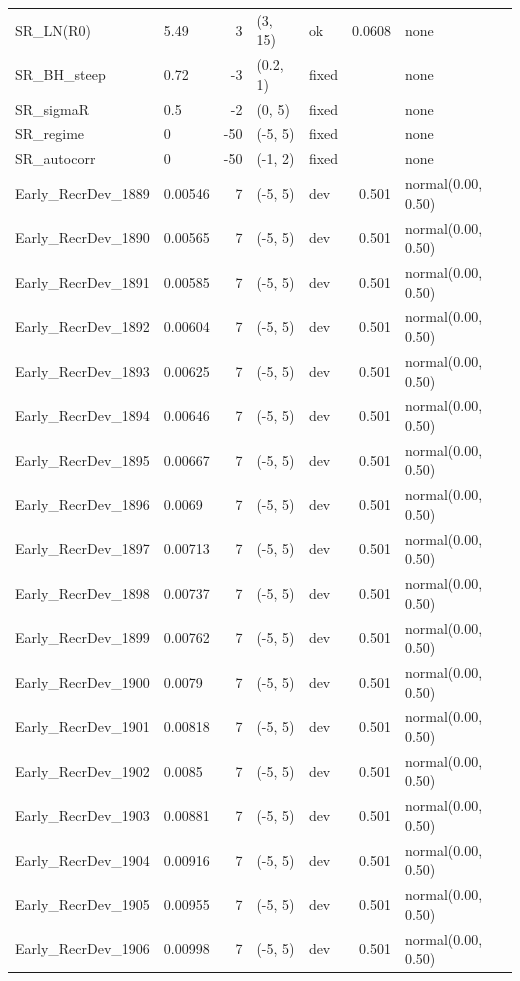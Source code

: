 \documentclass[
  english,
]{article}
\begin{document}
\begin{landscape}
\begin{longtable}{llrllrl}
SR\_LN(R0) & 5.49 & 3 & (3, 15) & ok & 0.0608 & none \\ 
SR\_BH\_steep & 0.72 & -3 & (0.2, 1) & fixed &  & none \\ 
SR\_sigmaR & 0.5 & -2 & (0, 5) & fixed &  & none \\ 
SR\_regime & 0 & -50 & (-5, 5) & fixed &  & none \\ 
SR\_autocorr & 0 & -50 & (-1, 2) & fixed &  & none \\ 
Early\_RecrDev\_1889 & 0.00546 & 7 & (-5, 5) & dev & 0.501 & normal(0.00, 0.50) \\ 
Early\_RecrDev\_1890 & 0.00565 & 7 & (-5, 5) & dev & 0.501 & normal(0.00, 0.50) \\ 
Early\_RecrDev\_1891 & 0.00585 & 7 & (-5, 5) & dev & 0.501 & normal(0.00, 0.50) \\ 
Early\_RecrDev\_1892 & 0.00604 & 7 & (-5, 5) & dev & 0.501 & normal(0.00, 0.50) \\ 
Early\_RecrDev\_1893 & 0.00625 & 7 & (-5, 5) & dev & 0.501 & normal(0.00, 0.50) \\ 
Early\_RecrDev\_1894 & 0.00646 & 7 & (-5, 5) & dev & 0.501 & normal(0.00, 0.50) \\ 
Early\_RecrDev\_1895 & 0.00667 & 7 & (-5, 5) & dev & 0.501 & normal(0.00, 0.50) \\ 
Early\_RecrDev\_1896 & 0.0069 & 7 & (-5, 5) & dev & 0.501 & normal(0.00, 0.50) \\ 
Early\_RecrDev\_1897 & 0.00713 & 7 & (-5, 5) & dev & 0.501 & normal(0.00, 0.50) \\ 
Early\_RecrDev\_1898 & 0.00737 & 7 & (-5, 5) & dev & 0.501 & normal(0.00, 0.50) \\ 
Early\_RecrDev\_1899 & 0.00762 & 7 & (-5, 5) & dev & 0.501 & normal(0.00, 0.50) \\ 
Early\_RecrDev\_1900 & 0.0079 & 7 & (-5, 5) & dev & 0.501 & normal(0.00, 0.50) \\ 
Early\_RecrDev\_1901 & 0.00818 & 7 & (-5, 5) & dev & 0.501 & normal(0.00, 0.50) \\ 
Early\_RecrDev\_1902 & 0.0085 & 7 & (-5, 5) & dev & 0.501 & normal(0.00, 0.50) \\ 
Early\_RecrDev\_1903 & 0.00881 & 7 & (-5, 5) & dev & 0.501 & normal(0.00, 0.50) \\ 
Early\_RecrDev\_1904 & 0.00916 & 7 & (-5, 5) & dev & 0.501 & normal(0.00, 0.50) \\ 
Early\_RecrDev\_1905 & 0.00955 & 7 & (-5, 5) & dev & 0.501 & normal(0.00, 0.50) \\ 
Early\_RecrDev\_1906 & 0.00998 & 7 & (-5, 5) & dev & 0.501 & normal(0.00, 0.50) \\ 

\end{longtable}
\end{landscape}
\end{document}
